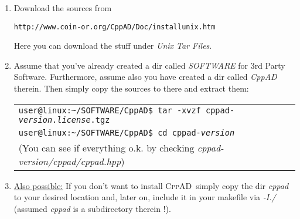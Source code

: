 \documentclass[a4paper,12pt]{article}
\makeatletter
\newcommand{\tbase}{\texttt{user@linux:\textasciitilde/}}
\newcommand{\cppad}{\textsc{CppAD}\ }
\makeatother
\begin{document}
\renewcommand{\labelenumi}
  {%
    \ding{\value{loc1}}}
\begin{enumerate}
\item Download the sources from 
 \begin{center}
   \texttt{http://www.coin-or.org/CppAD/Doc/installunix.htm}
\end{center}
Here you can download the stuff under \textit{Unix Tar Files}.
\item Assume that you've already created a dir called \textit{SOFTWARE} for
  3rd Party Software. Furthermore, assume also you have created a dir called
  \textit{CppAD} therein. Then simply copy the sources to there and extract them:
  \begin{center}
   \begin{tabular}{l} 
   \texttt{\tbase SOFTWARE/CppAD\$ tar -xvzf
     cppad-\textit{version}.\textit{license}.tgz}\\
     \texttt{\tbase SOFTWARE/CppAD\$ cd cppad-\textit{version}}\\
     (You can see if everything o.k. by checking \textit{cppad-\textit{version}/cppad/cppad.hpp}) 
     \end{tabular}
\end{center}

\item \underline{Also possible:} If you don't want to install \cppad simply copy the dir \textit{cppad} to
  your desired location and, later on, include it in your makefile via
  \textit{-I./} (assumed \textit{cppad} is a subdirectory therein !). 
  

\end{enumerate}
\end{document}
